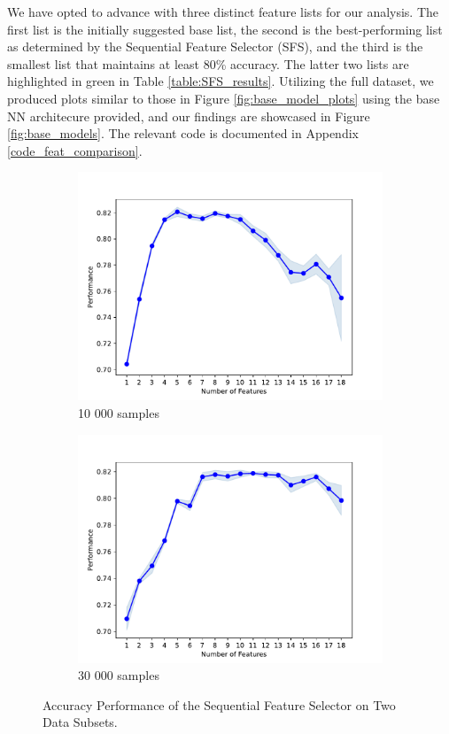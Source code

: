 \documentclass[]{article}
\begin{document}
We have opted to advance with three distinct feature lists for our analysis. The first list is the initially suggested base list, the second is the best-performing list as determined by the Sequential Feature Selector (SFS), and the third is the smallest list that maintains at least 80\% accuracy. The latter two lists are highlighted in green in Table \ref{table:SFS_results}. Utilizing the full dataset, we produced plots similar to those in Figure \ref{fig:base_model_plots} using the base NN architecure provided, and our findings are showcased in Figure \ref{fig:base_models}. The relevant code is documented in Appendix \ref{code_feat_comparison}.


	\begin{figure}[ht]
		\centering
		\begin{subfigure}{\textwidth}
			\centering
		\includegraphics[width=0.9\linewidth]{feature selection/feature_num_performance_10k.pdf}
		\caption{10 000 samples}
		\end{subfigure}
		
		\begin{subfigure}{\textwidth}
		\centering
		\includegraphics[width=0.9\linewidth]{feature selection/feature_num_performance_30k.pdf}
		\caption{30 000 samples}
		\end{subfigure}
		\caption{Accuracy Performance of the Sequential Feature Selector on Two Data Subsets.}
		\label{fig:SFS_results}
	\end{figure}
	
\end{document}
